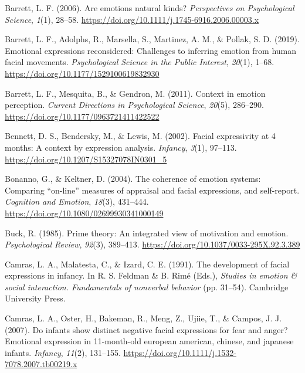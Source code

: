 \documentclass[
  english,
  doc]{apa7}
\newlength{\cslhangindent}
\newenvironment{cslreferences}%
  {\setlength{\parindent}{0pt}%
  \everypar{\setlength{\hangindent}{\cslhangindent}}\ignorespaces}%
  {\par}
\begin{document}
\begin{cslreferences}
\leavevmode\hypertarget{ref-barrett2006emotions}{}%
Barrett, L. F. (2006). Are emotions natural kinds? \emph{Perspectives on Psychological Science}, \emph{1}(1), 28--58. \url{https://doi.org/10.1111/j.1745-6916.2006.00003.x}

\leavevmode\hypertarget{ref-barrett2019emotional}{}%
Barrett, L. F., Adolphs, R., Marsella, S., Martinez, A. M., \& Pollak, S. D. (2019). Emotional expressions reconsidered: Challenges to inferring emotion from human facial movements. \emph{Psychological Science in the Public Interest}, \emph{20}(1), 1--68. \url{https://doi.org/10.1177/1529100619832930}

\leavevmode\hypertarget{ref-barrett2011context}{}%
Barrett, L. F., Mesquita, B., \& Gendron, M. (2011). Context in emotion perception. \emph{Current Directions in Psychological Science}, \emph{20}(5), 286--290. \url{https://doi.org/10.1177/0963721411422522}

\leavevmode\hypertarget{ref-bennett2002facial}{}%
Bennett, D. S., Bendersky, M., \& Lewis, M. (2002). Facial expressivity at 4 months: A context by expression analysis. \emph{Infancy}, \emph{3}(1), 97--113. \url{https://doi.org/10.1207/S15327078IN0301_5}

\leavevmode\hypertarget{ref-bonanno2004brief}{}%
Bonanno, G., \& Keltner, D. (2004). The coherence of emotion systems: Comparing ``on-line'' measures of appraisal and facial expressions, and self-report. \emph{Cognition and Emotion}, \emph{18}(3), 431--444. \url{https://doi.org/10.1080/02699930341000149}

\leavevmode\hypertarget{ref-buck1985prime}{}%
Buck, R. (1985). Prime theory: An integrated view of motivation and emotion. \emph{Psychological Review}, \emph{92}(3), 389--413. \url{https://doi.org/10.1037/0033-295X.92.3.389}

\leavevmode\hypertarget{ref-camras1991development}{}%
Camras, L. A., Malatesta, C., \& Izard, C. E. (1991). The development of facial expressions in infancy. In R. S. Feldman \& B. Rimé (Eds.), \emph{Studies in emotion \& social interaction. Fundamentals of nonverbal behavior} (pp. 31--54). Cambridge University Press.

\leavevmode\hypertarget{ref-camras2007infants}{}%
Camras, L. A., Oster, H., Bakeman, R., Meng, Z., Ujiie, T., \& Campos, J. J. (2007). Do infants show distinct negative facial expressions for fear and anger? Emotional expression in 11-month-old european american, chinese, and japanese infants. \emph{Infancy}, \emph{11}(2), 131--155. \url{https://doi.org/10.1111/j.1532-7078.2007.tb00219.x}


\end{cslreferences}
\end{document}
